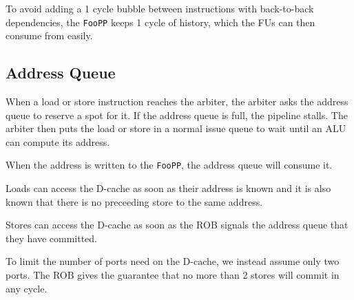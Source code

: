 \documentclass{article}
\begin{document}
To avoid adding a 1 cycle bubble between instructions with back-to-back
dependencies, the \texttt{FooPP} keeps 1 cycle of history, which the FUs can
then consume from easily.

\subsection{Address Queue}

When a load or store instruction reaches the arbiter, the arbiter asks the
address queue to reserve a spot for it. If the address queue is full, the
pipeline stalls. The arbiter then puts the load or store in a normal issue queue
to wait until an ALU can compute its address.

When the address is written to the \texttt{FooPP}, the address queue will
consume it.

Loads can access the D-cache as soon as their address is known and it is also
known that there is no preceeding store to the same address.

Stores can access the D-cache as soon as the ROB signals the address queue that
they have committed.

To limit the number of ports need on the D-cache, we instead assume only two
ports. The ROB gives the guarantee that no more than 2 stores will commit in any
cycle.
\end{document}
